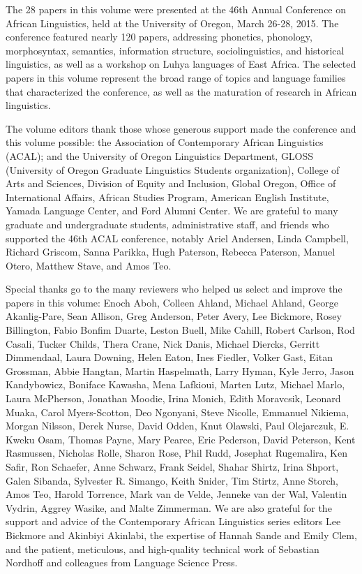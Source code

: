 \largerpage
The 28 papers in this volume were presented at the 46th Annual Conference on African Linguistics, held at the University of Oregon, March 26-28, 2015. The conference featured nearly 120 papers, addressing phonetics, phonology, morphosyntax, semantics, information structure, sociolinguistics, and historical linguistics, as well as a workshop on Luhya languages of East Africa. The selected papers in this volume represent the broad range of topics and language families that characterized the conference, as well as the maturation of research in African linguistics.

The volume editors thank those whose generous support made the conference and this volume possible: the Association of Contemporary African Linguistics (ACAL); 
and the University of Oregon Linguistics Department, 
 GLOSS (University of Oregon Graduate Linguistics Students organization), 
 College of Arts and Sciences, 
 Division of Equity and Inclusion, 
 Global Oregon, 
 Office of International Affairs,
 African Studies Program,
 American English Institute, 
 Yamada Language Center, 
 and Ford Alumni Center.
We are grateful to many graduate and undergraduate students, administrative staff, and friends who supported the 46th ACAL conference, notably 
  Ariel Andersen, 
  Linda Campbell, 
  Richard Griscom, 
  Sanna Parikka, 
  Hugh Paterson, 
  Rebecca Paterson, 
  Manuel Otero, 
  Matthew Stave, 
  and Amos Teo.

Special thanks go to the many reviewers who helped us select and improve the papers in this volume: 
Enoch Aboh,
Colleen Ahland,
Michael Ahland,
George Akanlig-Pare,
Sean Allison,
Greg Anderson,
Peter Avery,
Lee Bickmore,
Rosey Billington,
Fabio Bonfim Duarte,
Leston Buell,
Mike Cahill,
Robert Carlson,
Rod Casali,
Tucker Childs,
Thera Crane,
Nick Danis,
Michael Diercks,
Gerritt Dimmendaal,
Laura Downing,
Helen Eaton,
Ines Fiedler,
Volker Gast,
Eitan Grossman,
Abbie Hangtan,
Martin Haspelmath,
Larry Hyman,
Kyle Jerro,
Jason Kandybowicz,
Boniface Kawasha,
Mena Lafkioui,
Marten Lutz,
Michael Marlo,
Laura McPherson,
Jonathan Moodie,
Irina Monich,
Edith Moravcsik,
Leonard Muaka,
Carol Myers-Scotton,
Deo Ngonyani,
Steve Nicolle,
Emmanuel Nikiema,
Morgan Nilsson,
Derek Nurse,
David Odden,
Knut Olawski,
Paul Olejarczuk,
E. Kweku Osam,
Thomas Payne,
Mary Pearce,
Eric Pederson,
David Peterson,
Kent Rasmussen,
Nicholas Rolle,
Sharon Rose,
Phil Rudd,
Josephat Rugemalira,
Ken Safir,
Ron Schaefer,
Anne Schwarz,
Frank Seidel,
Shahar Shirtz,
Irina Shport,
Galen Sibanda,
Sylvester R. Simango,
Keith Snider,
Tim Stirtz,
Anne Storch,
Amos Teo,
Harold Torrence,
Mark van de Velde,
Jenneke van der Wal,
Valentin Vydrin,
Aggrey Wasike,
and Malte Zimmerman.
 We are also grateful for the support and advice of the Contemporary African Linguistics series editors Lee Bickmore and Akinbiyi Akinlabi, the expertise of Hannah Sande and Emily Clem, and the patient, meticulous, and high-quality technical work of Sebastian Nordhoff and colleagues from Language Science Press. 